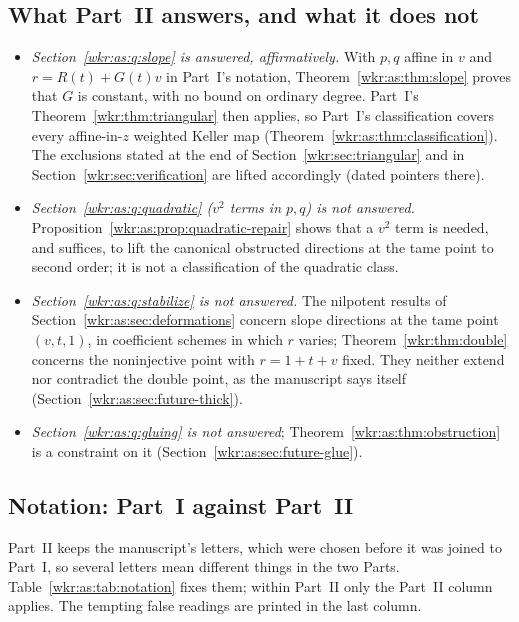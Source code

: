 \documentclass[11pt,a4paper]{article}
\numberwithin{equation}{section}
\theoremstyle{definition}
\theoremstyle{remark}
\begin{document}
\subsection{What Part~II answers, and what it does not}
\label{wkr:as:sec:answers}
\begin{itemize}
\item \emph{Section~\ref{wkr:as:q:slope} is answered, affirmatively.}
With $p,q$ affine in $v$ and $r=R(t)+G(t)v$ in Part~I's notation,
Theorem~\ref{wkr:as:thm:slope} proves that $G$ is constant, with no bound
on ordinary degree. Part~I's Theorem~\ref{wkr:thm:triangular} then
applies, so Part~I's classification covers every affine-in-$z$ weighted
Keller map (Theorem~\ref{wkr:as:thm:classification}). The exclusions
stated at the end of Section~\ref{wkr:sec:triangular} and in
Section~\ref{wkr:sec:verification} are lifted accordingly (dated pointers
there).
\item \emph{Section~\ref{wkr:as:q:quadratic} ($v^2$ terms in $p,q$) is not
answered.} Proposition~\ref{wkr:as:prop:quadratic-repair} shows that a
$v^2$ term is needed, and suffices, to lift the canonical obstructed
directions at the tame point to second order; it is not a classification
of the quadratic class.
\item \emph{Section~\ref{wkr:as:q:stabilize} is not answered.} The
nilpotent results of Section~\ref{wkr:as:sec:deformations} concern slope
directions at the tame point $(v,t,1)$, in coefficient schemes in which
$r$ varies; Theorem~\ref{wkr:thm:double} concerns the noninjective point
with $r=1+t+v$ fixed. They neither extend nor contradict the double point,
as the manuscript says itself (Section~\ref{wkr:as:sec:future-thick}).
\item \emph{Section~\ref{wkr:as:q:gluing} is not answered};
Theorem~\ref{wkr:as:thm:obstruction} is a constraint on it
(Section~\ref{wkr:as:sec:future-glue}).
\end{itemize}

\subsection{Notation: Part~I against Part~II}\label{wkr:as:sec:notation}
Part~II keeps the manuscript's letters, which were chosen before it was
joined to Part~I, so several letters mean different things in the two
Parts. Table~\ref{wkr:as:tab:notation} fixes them; within Part~II only the
Part~II column applies. The tempting false readings are printed in the
last column.
\end{document}

